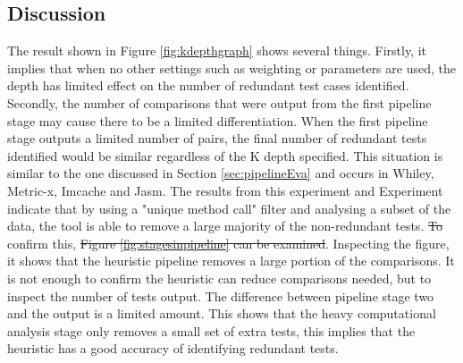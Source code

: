 \documentclass[11pt
              , a4paper
              , twoside
              , openright
              ]{report}
\newcommand{\rom}[1]{\uppercase\expandafter{\romannumeral #1\relax}}
\providecommand{\DIFadd}[1]{{\protect\color{blue}\uwave{#1}}} %
\providecommand{\DIFdel}[1]{{\protect\color{red}\sout{#1}}}                      %
\providecommand{\DIFaddbegin}{} %
\providecommand{\DIFaddend}{} %
\providecommand{\DIFdelbegin}{} %
\providecommand{\DIFdelend}{} %
\begin{document}
\subsection{Discussion} \DIFaddbegin {}
\DIFaddend The result shown in Figure \ref{fig:kdepthgraph} shows several things. Firstly, it implies that when no other settings such as weighting or parameters are used, the depth has limited effect on the number of redundant test cases identified. Secondly, the number of comparisons that were output from the first pipeline stage may cause there to be a limited differentiation. When the first pipeline stage outputs a limited number of pairs, the final number of redundant tests identified would be similar regardless of the K depth specified. This situation is similar to the one discussed in Section \ref{sec:pipelineEva} and occurs in Whiley, Metric-x, Imcache and Jasm. The results from this experiment and Experiment \rom{1} indicate that by using a "unique method call" filter and analysing a subset of the data, the tool is able to remove a large majority of the non-redundant tests. \DIFdelbegin \DIFdel{To }\DIFdelend \DIFaddbegin \DIFadd{We can examine Figure \ref{fig:stagesinpipeline} to }\DIFaddend confirm this,  \DIFdelbegin \DIFdel{Figure \ref{fig:stagesinpipeline} can be examined}\DIFdelend . Inspecting the figure, it shows that the heuristic pipeline removes a large portion of the comparisons. It is not enough to confirm the heuristic can reduce comparisons needed, but to inspect the number of tests output. The difference between pipeline stage two and the output is a limited amount. This shows that the heavy computational analysis stage only removes a small set of extra tests, this implies that the heuristic has a good accuracy of identifying redundant tests.
\DIFdelbegin %
\end{document}
